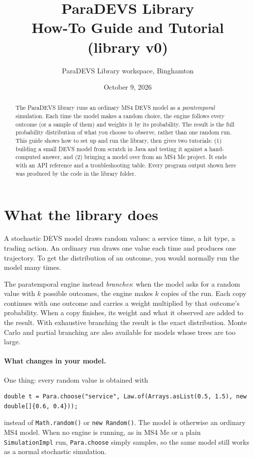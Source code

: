 \documentclass[11pt]{article}
\title{\textbf{ParaDEVS Library}\\[4pt]\large How-To Guide and Tutorial (library v0)}
\author{ParaDEVS Library workspace, Binghamton}
\date{October 9, 2026}
\newcommand{\code}[1]{\texttt{#1}}
\begin{document}
\maketitle

\begin{abstract}
\noindent The ParaDEVS library runs an ordinary MS4 DEVS model as a \emph{paratemporal} simulation. Each time
the model makes a random choice, the engine follows every outcome (or a sample of them) and weights it by its
probability. The result is the full probability distribution of what you choose to observe, rather than one random run.
This guide shows how to set up and run the library, then gives two tutorials: (1) building a small DEVS model from
scratch in Java and testing it against a hand-computed answer, and (2) bringing a model over from an MS4 Me project.
It ends with an API reference and a troubleshooting table. Every program output shown here was produced by the code
in the library folder.
\end{abstract}

\relateddocs

\tableofcontents
\newpage

\section{What the library does}

A stochastic DEVS model draws random values: a service time, a hit type, a trading action. An ordinary run draws one
value each time and produces one trajectory. To get the distribution of an outcome, you would normally run the model many times.

The paratemporal engine instead \emph{branches}: when the model asks for a random value with $k$ possible outcomes,
the engine makes $k$ copies of the run. Each copy continues with one outcome and carries a weight multiplied by that
outcome's probability. When a copy finishes, its weight and what it observed are added to the result. With
exhaustive branching the result is the exact distribution. Monte Carlo and partial branching are also available for
models whose trees are too large.

\paragraph{What changes in your model.} One thing: every random value is obtained with
\begin{lstlisting}
double t = Para.choose("service", Law.of(Arrays.asList(0.5, 1.5), new double[]{0.6, 0.4}));
\end{lstlisting}
instead of \code{Math.random()} or \code{new Random()}. The model is otherwise an ordinary MS4 model. When no engine is
running, as in MS4 Me or a plain \code{SimulationImpl} run, \code{Para.choose} simply samples, so the same model still
works as a normal stochastic simulation.
\end{document}
